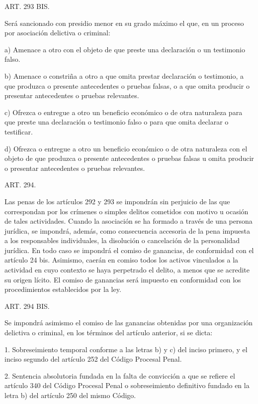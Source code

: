     ART. 293 BIS.

    Será sancionado con presidio menor en su grado máximo el que, en un proceso por asociación delictiva o criminal:

    a) Amenace a otro con el objeto de que preste una declaración o un testimonio falso.

    b) Amenace o constriña a otro a que omita prestar declaración o testimonio, a que produzca o presente antecedentes o pruebas falsas, o a que omita producir o presentar antecedentes o pruebas relevantes.

    c) Ofrezca o entregue a otro un beneficio económico o de otra naturaleza para que preste una declaración o testimonio falso o para que omita declarar o testificar.

    d) Ofrezca o entregue a otro un beneficio económico o de otra naturaleza con el objeto de que produzca o presente antecedentes o pruebas falsas u omita producir o presentar antecedentes o pruebas relevantes.


    ART. 294.

    Las penas de los artículos 292 y 293 se impondrán sin perjuicio de las que correspondan por los crímenes o simples delitos cometidos con motivo u ocasión de tales actividades.
    Cuando la asociación se ha formado a través de una persona jurídica, se impondrá, además, como consecuencia accesoria de la pena impuesta a los responsables individuales, la disolución o cancelación de la personalidad jurídica.
    En todo caso se impondrá el comiso de ganancias, de conformidad con el artículo 24 bis. Asimismo, caerán en comiso todos los activos vinculados a la actividad en cuyo contexto se haya perpetrado el delito, a menos que se acredite su origen lícito.
    El comiso de ganancias será impuesto en conformidad con los procedimientos establecidos por la ley.


    ART. 294 BIS.

    Se impondrá asimismo el comiso de las ganancias obtenidas por una organización delictiva o criminal, en los términos del artículo anterior, si se dicta:

    1. Sobreseimiento temporal conforme a las letras b) y c) del inciso primero, y el inciso segundo del artículo 252 del Código Procesal Penal.

    2. Sentencia absolutoria fundada en la falta de convicción a que se refiere el artículo 340 del Código Procesal Penal o sobreseimiento definitivo fundado en la letra b) del artículo 250 del mismo Código.

